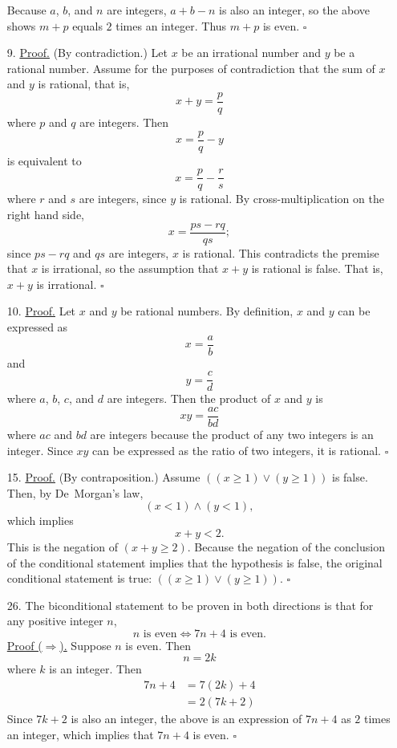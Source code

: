\documentclass{article}
\begin{document}
\begin{enumerate}
    Because $a$, $b$, and $n$ are integers, $a+b-n$ is also an integer, so the above shows $m+p$ equals $2$ times an integer. Thus $m+p$ is even. $\square$ 
    \item[9.] \underline{Proof.} (By contradiction.) Let $x$ be an irrational number and $y$ be a rational number. Assume for the purposes of contradiction that the sum of $x$ and $y$ is rational, that is,
    \[
    x + y = \frac{p}{q}
    \]
    where $p$ and $q$ are integers. Then
    \[
    x = \frac{p}{q} - y
    \]
    is equivalent to
    \[
    x = \frac{p}{q} - \frac{r}{s}
    \]
    where $r$ and $s$ are integers, since $y$ is rational. By cross-multiplication on the right hand side,
    \[
    x = \frac{ps - rq}{qs};
    \]
    since $ps-rq$ and $qs$ are integers, $x$ is rational. This contradicts the premise that $x$ is irrational, so the assumption that $x+y$ is rational is false. That is, $x+y$ is irrational. $\square$
    \item[10.] \underline{Proof.} Let $x$ and $y$ be rational numbers. By definition, $x$ and $y$ can be expressed as
    \[
    x = \frac{a}{b}
    \]
    and
    \[
    y = \frac{c}{d}
    \]
    where $a$, $b$, $c$, and $d$ are integers. Then the product of $x$ and $y$ is
    \[
    xy = \frac{ac}{bd}
    \]
    where $ac$ and $bd$ are integers because the product of any two integers is an integer. Since $xy$ can be expressed as the ratio of two integers, it is rational. $\square$
    \item[15.] \underline{Proof.} (By contraposition.) Assume $((x \ge 1) \lor (y \ge 1))$ is false. Then, by De~Morgan's law,
    \[
    (x < 1) \land (y < 1),
    \]
    which implies
    \[
    x + y < 2.
    \]
    This is the negation of $(x + y \ge 2)$. Because the negation of the conclusion of the conditional statement implies that the hypothesis is false, the original conditional statement is true: $((x \ge 1) \lor (y \ge 1))$. $\square$
    \item[26.] The biconditional statement to be proven in both directions is that for any positive integer $n$,
    \[
    n \textrm{ is even} \Leftrightarrow 7n+4 \textrm{ is even.}
    \]
    \underline{Proof ($\Rightarrow$).} Suppose $n$ is even. Then
    \[
    n = 2k
    \]
    where $k$ is an integer. Then
    \begin{align*}
    7n+4 &= 7(2k)+4 \\
    &= 2(7k+2)
    \end{align*}
    Since $7k+2$ is also an integer, the above is an expression of $7n+4$ as $2$ times an integer, which implies that $7n+4$ is even. $\square$


\end{enumerate}
\end{document}
